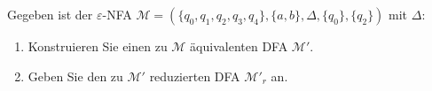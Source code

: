 \begin{exercise}
Gegeben ist der $\varepsilon$-NFA $\mathcal{M} = (\{q_0,q_1,q_2,q_3,q_4\}, \{a, b\},
\Delta, \{q_{0}\}, \{q_{2}\})$ mit $\Delta$:
\begin{center}
  
\end{center}

\begin{enumerate}
  \item Konstruieren Sie einen zu $\mathcal M$ äquivalenten DFA $\mathcal M'$.
  \item Geben Sie den zu $\mathcal M'$ reduzierten DFA $\mathcal M'_r$ an.
  \end{enumerate}
\end{exercise}

